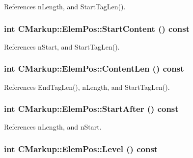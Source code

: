 References nLength, and StartTagLen().
\subsubsection[StartContent]{\setlength{\rightskip}{0pt plus 5cm}int CMarkup::ElemPos::StartContent () const\hspace{0.3cm}{\tt  [inline]}}\label{structCMarkup_1_1ElemPos_853d5e4a5c6b03643e7210671385896c}




References nStart, and StartTagLen().
\subsubsection[ContentLen]{\setlength{\rightskip}{0pt plus 5cm}int CMarkup::ElemPos::ContentLen () const\hspace{0.3cm}{\tt  [inline]}}\label{structCMarkup_1_1ElemPos_9099635ab9239103aa930b2f1a456d2d}




References EndTagLen(), nLength, and StartTagLen().
\subsubsection[StartAfter]{\setlength{\rightskip}{0pt plus 5cm}int CMarkup::ElemPos::StartAfter () const\hspace{0.3cm}{\tt  [inline]}}\label{structCMarkup_1_1ElemPos_e1e21b6e27db22eda6178898d2aa42d3}




References nLength, and nStart.
\subsubsection[Level]{\setlength{\rightskip}{0pt plus 5cm}int CMarkup::ElemPos::Level () const\hspace{0.3cm}{\tt  [inline]}}\label{structCMarkup_1_1ElemPos_cdea1fc74ed96d413138c6c2d9b0a4f7}




